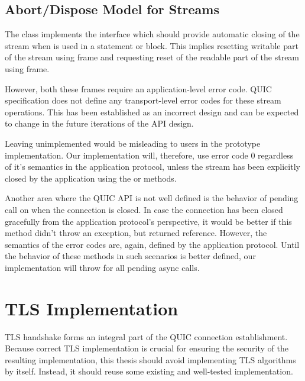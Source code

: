 \subsection{Abort/Dispose Model for Streams}

The \QuicStream{} class implements the  interface which should provide
automatic closing of the stream when \QuicStream{} is used in a  statement or
 block. This implies resetting writable part of the stream using \RESETSTREAM{} frame
and requesting reset of the readable part of the stream using \STOPSENDING{} frame.

However, both these frames require an application-level error code. QUIC specification does not
define any transport-level error codes for these stream operations. This has been established as an
incorrect design and can be expected to change in the future iterations of the API design.

Leaving  unimplemented would be misleading to users in the prototype
implementation. Our implementation will, therefore, use error code 0 regardless of it's semantics in
the application protocol, unless the stream has been explicitly closed by the application using the
 or  methods.

Another area where the QUIC API is not well defined is the behavior of pending 
call on \QuicConnection{} when the connection is closed. In case the connection has been closed
gracefully from the application protocol's perspective, it would be better if this method didn't
throw an exception, but returned  reference. However, the semantics of the error codes
are, again, defined by the application protocol. Until the behavior of these methods in such
scenarios is better defined, our implementation will throw
 for all pending async calls.

\section{TLS Implementation}

TLS handshake forms an integral part of the QUIC connection establishment. Because correct TLS
implementation is crucial for ensuring the security of the resulting implementation, this thesis
should avoid implementing TLS algorithms by itself. Instead, it should reuse some existing and
well-tested implementation.

